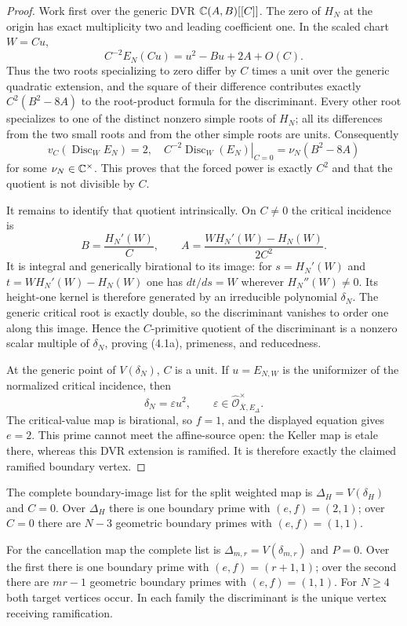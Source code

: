 \begin{proof}
Work first over the generic DVR $\mathbb C(A,B)[[C]]$.  The zero of $H_N$ at the
origin has exact multiplicity two and leading coefficient one.  In the
scaled chart $W=Cu$,
\[
 C^{-2}E_N(Cu)=u^2-Bu+2A+O(C).                          \tag{4.1b}
\]
Thus the two roots specializing to zero differ by $C$ times a unit over the
generic quadratic extension, and the square of their difference contributes
exactly
$C^2(B^2-8A)$ to the root-product formula for the discriminant.  Every other
root specializes to one of the distinct nonzero simple roots of $H_N$; all
its differences from the two small roots and from the other simple roots are
units.  Consequently
\[
 v_C(\operatorname{Disc}_W E_N)=2,
 \quad
 \left.C^{-2}\operatorname{Disc}_W(E_N)\right|_{C=0}
   =\nu_N(B^2-8A)
\]
for some $\nu_N\in\mathbb C^\times$.  This proves that the forced power is exactly
$C^2$ and that the quotient is not divisible by $C$.

It remains to identify that quotient intrinsically.  On $C\ne0$ the
critical incidence is
\[
 B=\frac{H_N'(W)}{C},\qquad
 A=\frac{WH_N'(W)-H_N(W)}{2C^2}.
\]
It is integral and generically birational to its image: for
$s=H_N'(W)$ and $t=WH_N'(W)-H_N(W)$ one has $dt/ds=W$ wherever
$H_N''(W)\ne0$.  Its height-one kernel is therefore generated by an
irreducible polynomial $\delta_N$.  The generic critical root is exactly
double, so the discriminant vanishes to order one along this image.  Hence
the $C$-primitive quotient of the discriminant is a nonzero scalar multiple
of $\delta_N$, proving (4.1a), primeness, and reducedness.

At the generic point of $V(\delta_N)$, $C$ is a unit.  If
$u=E_{N,W}$ is the uniformizer of the normalized critical incidence, then
\[
 \delta_N=\varepsilon u^2,
 \qquad
 \varepsilon\in
 \widehat{\mathcal O}_{\overline X,E_\Delta}^{\times}.
\]
The critical-value map is birational, so $f=1$, and the displayed equation
gives $e=2$.  This prime cannot meet the affine-source open: the Keller map
is etale there, whereas this DVR extension is ramified.  It is therefore
exactly the claimed ramified boundary vertex.
\end{proof}

\begin{lemma}\label{lem:boundary}
The complete boundary-image list for the split weighted map is
$\Delta_H=V(\delta_H)$ and $C=0$.  Over $\Delta_H$ there is one boundary
prime with $(e,f)=(2,1)$; over $C=0$ there are $N-3$ geometric boundary
primes with $(e,f)=(1,1)$.

For the cancellation map the complete list is
$\Delta_{m,r}=V(\delta_{m,r})$ and $P=0$.  Over the first there is one
boundary prime with $(e,f)=(r+1,1)$; over the second there are $mr-1$
geometric boundary primes with $(e,f)=(1,1)$.  For $N\ge4$ both target
vertices occur.  In each family the discriminant is the unique vertex
receiving ramification.
\end{lemma}

